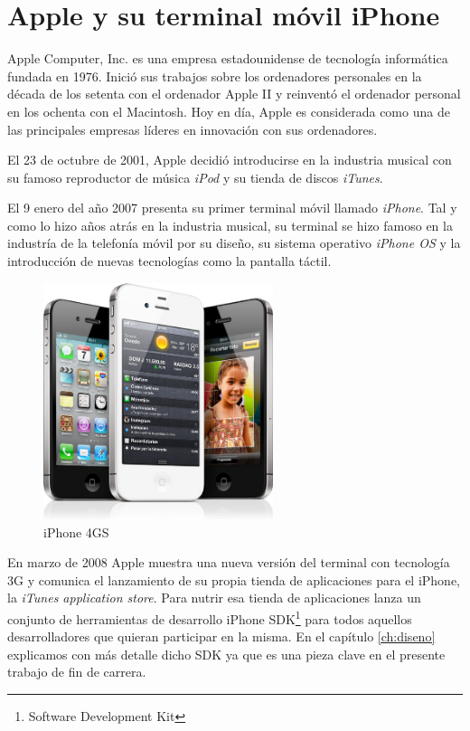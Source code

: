 
\section{Apple y su terminal móvil iPhone}
 
Apple Computer, Inc. es una empresa estadounidense de tecnología informática fundada en 1976. Inició sus trabajos sobre los ordenadores personales en la década de los setenta con el ordenador Apple II y reinventó el ordenador personal en los ochenta con el Macintosh. Hoy en día, Apple es considerada como una de las principales empresas líderes en innovación con sus ordenadores.  %

El 23 de octubre de 2001, Apple decidió introducirse en la industria musical con su famoso reproductor de música \emph{iPod} y su tienda de discos \emph{iTunes}.

El 9 enero del año 2007 presenta su primer terminal móvil llamado \emph{iPhone}. Tal y como lo hizo años atrás en la industria musical, su terminal se hizo famoso en la industría de la telefonía móvil por su diseño, su sistema operativo \emph{iPhone OS} y la introducción de nuevas tecnologías como la pantalla táctil.

\begin{figure} [h]
  \centering
    \includegraphics[width=0.6\textwidth]{./images/iphone4.jpg} 
  \caption{iPhone 4GS}
  \label{fig:iPhone-4GS}
\end{figure}
  
  En marzo de 2008 Apple muestra una nueva versión del terminal con tecnología 3G y comunica el lanzamiento de su propia tienda de aplicaciones para el iPhone, la \emph{iTunes application store}. Para nutrir esa tienda de aplicaciones  lanza un conjunto de herramientas de desarrollo iPhone SDK\footnote{Software Development Kit} para todos aquellos desarrolladores que quieran participar en la misma. En el capítulo \ref{ch:diseno}  explicamos con más detalle dicho SDK ya que es una pieza clave en el presente trabajo de fin de carrera. %
  
